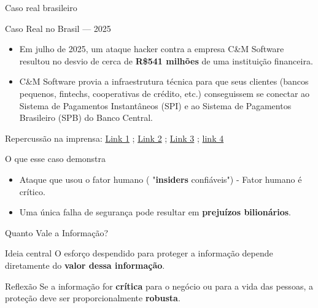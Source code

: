 \begin{frame}{Caso real brasileiro}

\begin{block}{Caso Real no Brasil — 2025}
\begin{itemize}
    \item Em julho de 2025, um ataque hacker contra a empresa C\&M Software resultou no desvio de cerca de \textbf{R\$541 milhões} de uma instituição financeira.

\item C\&M Software provia a infraestrutura técnica para que seus clientes (bancos pequenos, fintechs, cooperativas de crédito, etc.) conseguissem se conectar ao Sistema de Pagamentos Instantâneos (SPI) e ao Sistema de Pagamentos Brasileiro (SPB) do Banco Central.
\end{itemize}

\end{block}

\begin{block}{Repercussão na imprensa:}
\href{https://www.cnnbrasil.com.br/nacional/brasil/ataque-hacker-o-que-sabemos-sobre-golpe-que-desviou-r-541-milhoes/}{Link 1} ; 
\href{https://g1.globo.com/sp/sao-paulo/noticia/2025/07/04/ataque-hacker-quem-e-suspeito-de-entregar-acesso-ao-sistema-que-liga-bancos-do-pix.ghtml}{Link 2} ;
\href{https://cryptoid.com.br/ciberseguranca-seguranca-da-informacao/chaves-em-maos-erradas-licoes-do-maior-ataque-hacker-ao-sistema-financeiro/}{Link 3} ;
\href{https://exame.com/insight/a-vida-apos-o-ataque-hacker-a-bmp-perdeu-r-500-milhoes-mas-resistiu-e-vai-virar-banco-multiplo/p}{link 4}

\end{block}

\begin{alertblock}{O que esse caso demonstra}
\begin{itemize}
    \item Ataque que usou o fator humano ( "\textbf{insiders} confiáveis") - Fator humano é crítico.
    \item Uma única falha de segurança pode resultar em \textbf{prejuízos bilionários}.
\end{itemize}
\end{alertblock}

\end{frame}

\begin{frame}{Quanto Vale a Informação?}

\begin{block}{Ideia central}
O esforço despendido para proteger a informação depende diretamente do \textbf{valor dessa informação}.
\end{block}

\centering


\vspace{0.5cm}

\begin{alertblock}{Reflexão}
Se a informação for \textbf{crítica} para o negócio ou para a vida das pessoas, a proteção deve ser proporcionalmente \textbf{robusta}.
\end{alertblock}

\end{frame}

